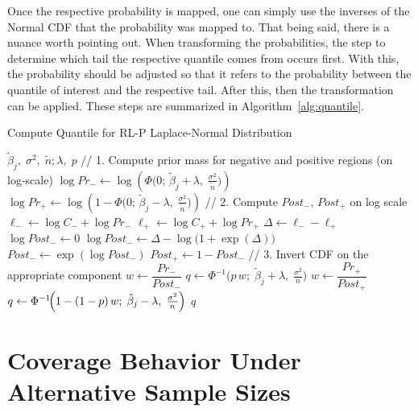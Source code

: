 Once the respective probability is mapped, one can simply use the inverses of the Normal CDF that the probability was mapped to. That being said, there is a nuance worth pointing out. When transforming the probabilities, the step to determine which tail the respective quantile comes from occurs first. With this, the probability should be adjusted so that it refers to the probability between the quantile of interest and the respective tail. After this, then the transformation can be applied. These steps are summarized in Algorithm~\ref{alg:quantile}.

\begin{algorithm}
\caption{Compute Quantile for RL-P Laplace-Normal Distribution}
\label{alg:quantile}
\begin{algorithmic}[1]
  \Require
    $\tilde{\beta}_j,\;\sigma^2,\;\tilde{n};\lambda,\;p$ 
  \Statex
  \State // 1. Compute prior mass for negative and positive regions (on log‐scale)
  \State $\log Pr_{-} \gets \log \left(\Phi\bigl(0;\,\tilde{\beta}_j + \lambda,\;\tfrac{\sigma^2}{\tilde{n}}\bigr)\right)$
  \State $\log Pr_{+} \gets \log \left(1 - \Phi\bigl(0;\,\tilde{\beta}_j - \lambda,\;\tfrac{\sigma^2}{\tilde{n}}\bigr)\right)$
  \Statex
  \State // 2. Compute $Post_{-},\,Post_{+}$ on log scale
  \State $\ell_{-} \gets \log C_{-} + \log Pr_{-}$
  \State $\ell_{+} \gets \log C_{+} + \log Pr_{+}$
  \State $\Delta \gets \ell_{-} - \ell_{+}$
  \If{$\exp(\Delta) = \infty$}
    \State $\log Post_{-} \gets 0$  
  \Else
    \State $\log Post_{-} \gets \Delta - \log\bigl(1 + \exp(\Delta)\bigr)$
  \EndIf
  \State $Post_{-} \gets \exp(\log Post_{-})$
  \State $Post_{+} \gets 1 - Post_{-}$
  \Statex
  \State // 3. Invert CDF on the appropriate component
    \State $w \gets \dfrac{Pr_{-}}{Post_{-}}$
    \State $q \gets \Phi^{-1}\bigl(p \,w;\;\tilde{\beta}_j + \lambda,\;\tfrac{\sigma^2}{n}\bigr)$
  \Else
    \State $w \gets \dfrac{Pr_{+}}{Post_{+}}$
    \State $q \gets \Phi^{-1}\!\Bigl(1 - (1-p)\,w;\;\tilde{\beta}_j - \lambda,\;\tfrac{\sigma^2}{n}\Bigr)$
  \EndIf
  \State \Return $q$
\end{algorithmic}
\end{algorithm}

\clearpage

\section{Coverage Behavior Under Alternative Sample Sizes}\label{Sup:alt_ns}


